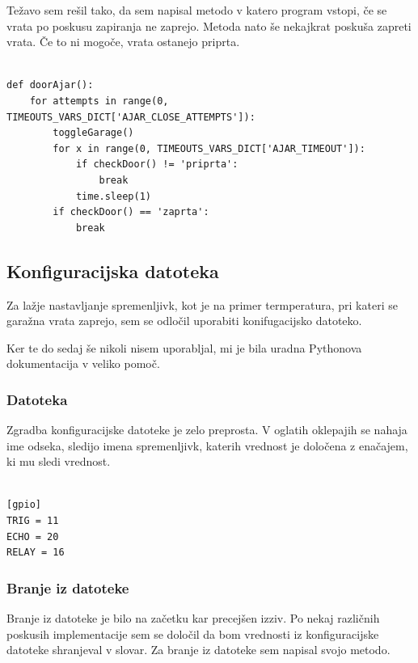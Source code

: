 \documentclass[11pt]{article}
\begin{document}
Težavo sem rešil tako, da sem napisal metodo v katero program vstopi, če se vrata po poskusu zapiranja ne zaprejo. Metoda nato še nekajkrat poskuša zapreti vrata. Če to ni mogoče, vrata ostanejo priprta.

\begin{verbatim}

def doorAjar():
    for attempts in range(0, TIMEOUTS_VARS_DICT['AJAR_CLOSE_ATTEMPTS']):
        toggleGarage()
        for x in range(0, TIMEOUTS_VARS_DICT['AJAR_TIMEOUT']):
            if checkDoor() != 'priprta':
                break
            time.sleep(1)
        if checkDoor() == 'zaprta':
            break
\end{verbatim}

\subsection{Konfiguracijska datoteka}
Za lažje nastavljanje spremenljivk, kot je na primer termperatura, pri kateri se garažna vrata zaprejo, sem se odločil uporabiti konifugacijsko datoteko.

Ker te do sedaj še nikoli nisem uporabljal, mi je bila uradna Pythonova dokumentacija \cite{Py_configParser} v veliko pomoč.

\subsubsection{Datoteka}
Zgradba konfiguracijske datoteke je zelo preprosta. V oglatih oklepajih se nahaja ime odseka, sledijo imena spremenljivk, katerih vrednost je določena z enačajem, ki mu sledi vrednost.
\begin{verbatim}

[gpio]
TRIG = 11
ECHO = 20
RELAY = 16
\end{verbatim}

\subsubsection{Branje iz datoteke}
Branje iz datoteke je bilo na začetku kar precejšen izziv. Po nekaj različnih poskusih implementacije sem se določil da bom vrednosti iz konfiguracijske datoteke shranjeval v slovar. Za branje iz datoteke sem napisal svojo metodo.
\end{document}
